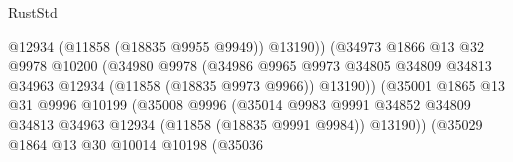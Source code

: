 \begin{lexlean}{RustStd}
\begin{coremodule}
                                                @12934
                                                (@11858 (@18835 @9955 @9949))
                                                @13190))
                                            (@34973
                                              @1866
                                              @13
                                              @32
                                              @9978
                                              @10200
                                              (@34980
                                                @9978
                                                (@34986
                                                  @9965
                                                  @9973
                                                  @34805
                                                  @34809
                                                  @34813
                                                  @34963
                                                  @12934
                                                  (@11858 (@18835 @9973 @9966))
                                                  @13190))
                                              (@35001
                                                @1865
                                                @13
                                                @31
                                                @9996
                                                @10199
                                                (@35008
                                                  @9996
                                                  (@35014
                                                    @9983
                                                    @9991
                                                    @34852
                                                    @34809
                                                    @34813
                                                    @34963
                                                    @12934
                                                    (@11858 (@18835 @9991 @9984))
                                                    @13190))
                                                (@35029
                                                  @1864
                                                  @13
                                                  @30
                                                  @10014
                                                  @10198
                                                  (@35036

\end{coremodule}
\end{lexlean}

